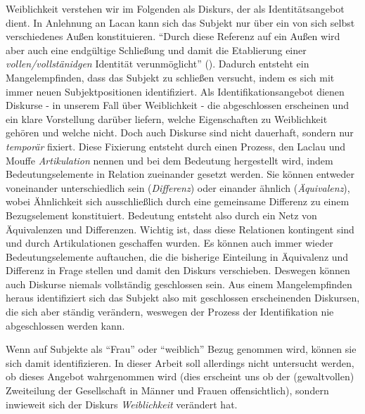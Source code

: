 \documentclass[12pt, titlepage=true, toc=bib]{scrartcl}
\begin{document}
{Weiblichkeit verstehen wir im Folgenden als Diskurs, der als Identitätsangebot dient. In Anlehnung an Lacan kann sich das Subjekt nur über ein von sich selbst verschiedenes Außen konstituieren. "`Durch diese Referenz auf ein Außen wird aber auch eine endgültige Schließung und damit die Etablierung einer \textit{vollen/vollstänidgen} Identität verunmöglicht"' (\cite[199; Hervorh. im Orig.]{nonhoff_kollektive_2007}). Dadurch entsteht ein Mangelempfinden, dass das Subjekt zu schließen versucht, indem es sich mit immer neuen Subjektpositionen identifiziert. Als Identifikationsangebot dienen Diskurse - in unserem Fall über Weiblichkeit - die abgeschlossen erscheinen und ein klare Vorstellung darüber liefern, welche Eigenschaften zu Weiblichkeit gehören und welche nicht. Doch auch Diskurse sind nicht dauerhaft, sondern nur \textit{temporär} fixiert. Diese Fixierung entsteht durch einen Prozess, den Laclau und Mouffe \textit{Artikulation} nennen und bei dem Bedeutung hergestellt wird, indem Bedeutungselemente in Relation zueinander gesetzt werden. Sie können entweder voneinander unterschiedlich sein (\textit{Differenz}) oder einander ähnlich (\textit{Äquivalenz}), wobei Ähnlichkeit sich ausschließlich durch eine gemeinsame Differenz zu einem Bezugselement konstituiert. Bedeutung entsteht also durch ein Netz von Äquivalenzen und Differenzen. Wichtig ist, dass diese Relationen kontingent sind und durch Artikulationen geschaffen wurden. Es können auch immer wieder Bedeutungselemente auftauchen, die die bisherige Einteilung in Äquivalenz und Differenz in Frage stellen und damit den Diskurs verschieben. Deswegen können auch Diskurse niemals vollständig geschlossen sein. Aus einem Mangelempfinden heraus identifiziert sich das Subjekt also mit geschlossen erscheinenden Diskursen, die sich aber ständig verändern, weswegen der Prozess der Identifikation nie abgeschlossen werden kann.

Wenn auf Subjekte als "`Frau"' oder "`weiblich"' Bezug genommen wird, können sie sich damit identifizieren. In dieser Arbeit soll allerdings nicht untersucht werden, ob dieses Angebot wahrgenommen wird (dies erscheint uns ob der (gewaltvollen) Zweiteilung der Gesellschaft in Männer und Frauen offensichtlich), sondern inwieweit sich der Diskurs \textit{Weiblichkeit} verändert hat. 

}
\end{document}
